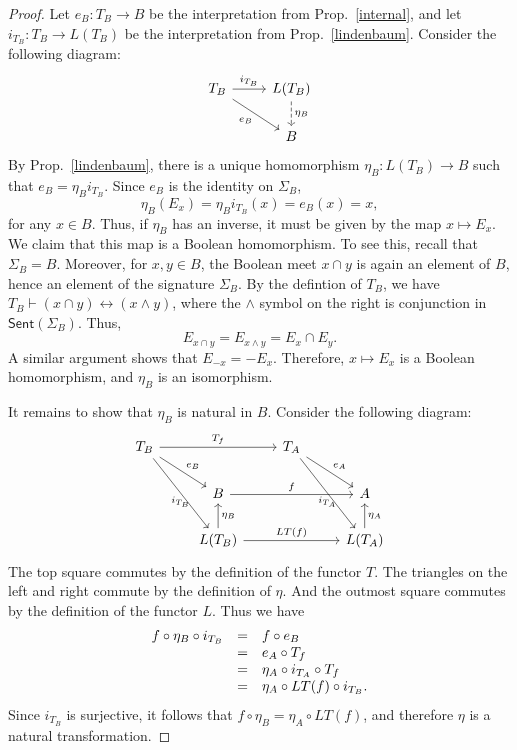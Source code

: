 \begin{proof} Let $e_B:T_B\to B$ be the interpretation from Prop.\
  \ref{internal}, and let $i_{T_B}:T_B\to L(T_B)$ be the
  interpretation from Prop.\ \ref{lindenbaum}.  Consider the following
  diagram:
  \[ \begin{tikzcd} T_B \arrow[r,"i_{T_B}"] \arrow[dr,"e_B"'] &
    L(T_B) \arrow[dashed,d,"\eta _B"] \\
    & B \end{tikzcd} \] By Prop.\ \ref{lindenbaum}, there is a unique
  homomorphism $\eta _B:L(T_B)\to B$ such that $e_B=\eta _Bi_{T_B}$.
  Since $e_B$ is the identity on $\Sigma _B$,
  \[ \eta _B(E_x)=\eta _Bi_{T_B}(x)=e_B(x)=x , \] for any $x\in
  B$. Thus, if $\eta _B$ has an inverse, it must be given by the map
  $x\mapsto E_x$.  We claim that this map is a Boolean homomorphism.
  To see this, recall that $\Sigma _B=B$.  Moreover, for $x,y\in B$,
  the Boolean meet $x\cap y$ is again an element of $B$, hence an
  element of the signature $\Sigma _B$.  By the defintion of $T_B$, we
  have $T_B\vdash (x\cap y)\leftrightarrow (x\wedge y)$, where the
  $\wedge$ symbol on the right is conjunction in $\mathsf{Sent}(\Sigma
  _B)$.  Thus,
  \[ E_{x\cap y}=E_{x\wedge y}=E_x\cap E_y .\] A similar argument
  shows that $E_{-x}=-E_x$.  Therefore, $x\mapsto E_x$ is a Boolean
  homomorphism, and $\eta _B$ is an isomorphism.

  It remains to show that $\eta _B$ is natural in $B$.  Consider the
  following diagram:
\[ \begin{tikzcd} T_B \arrow{rr}{T_f} \arrow{dr}{e_B}
  \arrow{ddr}[below]{i_{T_B}} & & T_A
  \arrow{dr}{e_A} \arrow{ddr}[below]{i_{T_A}} \\
  & B  \arrow{rr}{f} & & A  \\
  & L(T_B) \arrow[u,"\eta _B"'] \arrow{rr}{LT(f)} & & L(T_A) \arrow[u,"\eta _A"'] \end{tikzcd} \] The top square
commutes by the definition of the functor $T$.  The triangles on the
left and right commute by the definition of $\eta$.  And the outmost
square commutes by the definition of the functor $L$.  Thus we have
\[ \begin{array}{l l l} 
f\circ \eta _B\circ i_{T_B} & = & f\circ e_B \\
& = & e_A\circ T_f \\
& = & \eta _A\circ i_{T_A}\circ T_f \\
& = & \eta _A\circ LT(f)\circ i_{T_B} .
\end{array} \] Since $i_{T_B}$ is
surjective, it follows that $f\circ \eta _B=\eta _A\circ LT(f)$, and
therefore $\eta$ is a natural transformation.
\end{proof}

